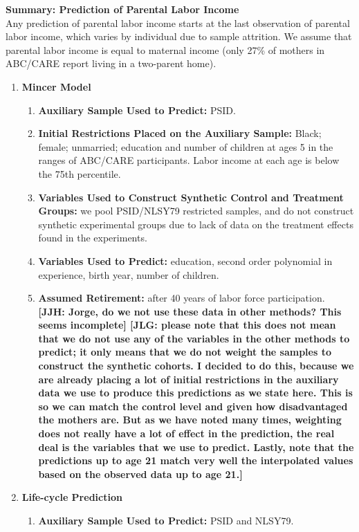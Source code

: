 \noindent \textbf{Summary: Prediction of Parental Labor Income}\\
\noindent Any prediction of parental labor income starts at the last observation of parental labor income, which varies by individual due to sample attrition. We assume that parental labor income is equal to maternal income (only 27\% of mothers in ABC/CARE report living in a two-parent home).
\begin{enumerate}
\item \textbf{Mincer Model}
\begin{enumerate}
\item \textbf{Auxiliary Sample Used to Predict:} PSID.
\item \textbf{Initial Restrictions Placed on the Auxiliary Sample:} Black; female; unmarried; education and number of children at ages 5 in the ranges of ABC/CARE participants. Labor income at each age is below the 75th percentile.
\item \textbf{Variables Used to Construct Synthetic Control and Treatment Groups:} we pool PSID/NLSY79 restricted samples, and do not construct synthetic experimental groups due to lack of data on the treatment effects found in the experiments.
\item \textbf{Variables Used to Predict:} education, second order polynomial in experience, birth year, number of children.
\item \textbf{Assumed Retirement:} after 40 years of labor force participation. \textbf{[JJH: Jorge, do we not use these data in other methods? This seems incomplete] [JLG: please note that this does not mean that we do not use any of the variables in the other methods to predict; it only means that we do not weight the samples to construct the synthetic cohorts. I decided to do this, because we are already placing a lot of initial restrictions in the auxiliary data we use to produce this predictions as we state here. This is so we can match the control level and given how disadvantaged the mothers are. But as we have noted many times, weighting does not really have a lot of effect in the prediction, the real deal is the variables that we use to predict. Lastly, note that the predictions up to age 21 match very well the interpolated values based on the observed data up to age 21.]}
\end{enumerate}
\item \textbf{Life-cycle Prediction}
\begin{enumerate}
\item \textbf{Auxiliary Sample Used to Predict:} PSID and NLSY79.

\end{enumerate}
\end{enumerate}
